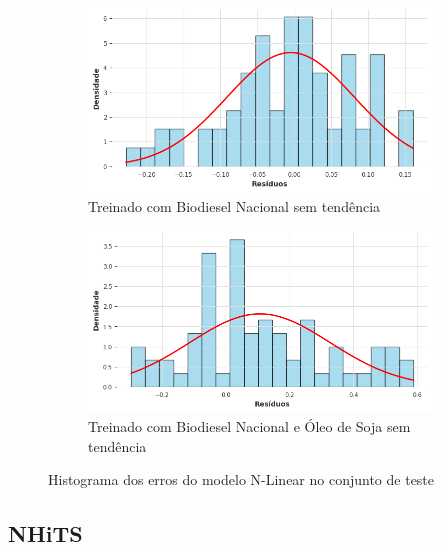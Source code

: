 \begin{figure}[htbp]
	\begin{subfigure}[b]{0.40\textwidth}
		\centering
		\includegraphics[width=\textwidth]{figuras/nlinear_brasil_detrend_residuals_histogram.png} %
		\caption{Treinado com Biodiesel Nacional sem tendência}
		\label{fig:nlinear_brasil_detrend_residuals_histogram}
	\end{subfigure}
	\hfill
	\begin{subfigure}[b]{0.40\textwidth}
		\centering
		\includegraphics[width=\textwidth]{figuras/nlinear_brasil_oil_detrend_residuals_histogram.png} %
		\caption{Treinado com Biodiesel Nacional e Óleo de Soja sem tendência}
		\label{fig:nlinear_brasil_oil_detrend_residuals_histogram}
	\end{subfigure}

	\caption{Histograma dos erros do modelo \acs{N-Linear} no conjunto de teste}
	\label{fig:nlinear_residuals_histogram}
\end{figure}

\subsection{\acs{NHiTS}}
